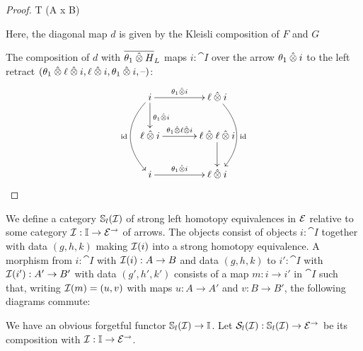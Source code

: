 \documentclass[reqno,10pt,a4paper,oneside]{amsart}
\begin{document}
\begin{proof}
T (A x B) 

Here, the diagonal map $d$ is given by the Kleisli composition of $F$ and $G$ 

The composition of $d$ with $\overline{\thetar \hatotimes H}_L$ maps $i : \cat{I}$ over the arrow $\thetar \hatotimes i$ to the left retract $(\thetar \hatotimes \intervall \hatotimes i, \intervall \hatotimes i, \thetar \hatotimes i, \mbox{--})$:
\[
\xymatrix@C+1em{
  i
  \ar[r]^-{\thetar \hatotimes i}
  \ar[d]^{\thetar \hatotimes i}
  \ar@/_2em/[dd]_{\id}
&
  \intervall \hatotimes i
  \ar@/^2em/[dd]^{\id}
\\
  \intervall \hatotimes i
  \ar[r]^-{\thetar \hatotimes \intervall \hatotimes i}
&
  \intervall \hatotimes \intervall \hatotimes i
  \ar[d]
\\
  i
  \ar[r]^-{\thetar \hatotimes i}
&
  \intervall \hatotimes i
}
\]


\end{proof}



\newcommand{\she}{\cat{S}}

\begin{definition}
We define a category $\cat{S}_l(\cal{I})$ of strong left homotopy equivalences in $\catE$ relative to some category $\cal{I} : \cat{I} \to \catE^{\to}$ of arrows.
The objects consist of objects $i : \cat{I}$ together with data $(g, h, k)$ making $\cal{I}(i)$ into a strong homotopy equivalence.
A morphism from $i : \cat{I}$ with $\cal{I}(i) : A \to B$ and data $(g, h, k)$ to $i' : \cat{I}$ with $\cal{I}(i') : A' \to B'$ with data $(g', h', k')$ consists of a map $m : i \to i'$ in $\cat{I}$ such that, writing $\cal{I}(m) = (u, v)$ with maps $u : A \to A'$ and $v : B \to B'$, the following diagrams commute:

We have an obvious forgetful functor $\cat{S}_l(\cal{I}) \to \cat{I}$.
Let $\cal{S}_l(\cal{I}) : \cat{S}_l(\cal{I}) \to \catE^{\to}$ be its composition with $\cal{I} : \cat{I} \to \catE^{\to}$.
\end{definition}
\end{document}
